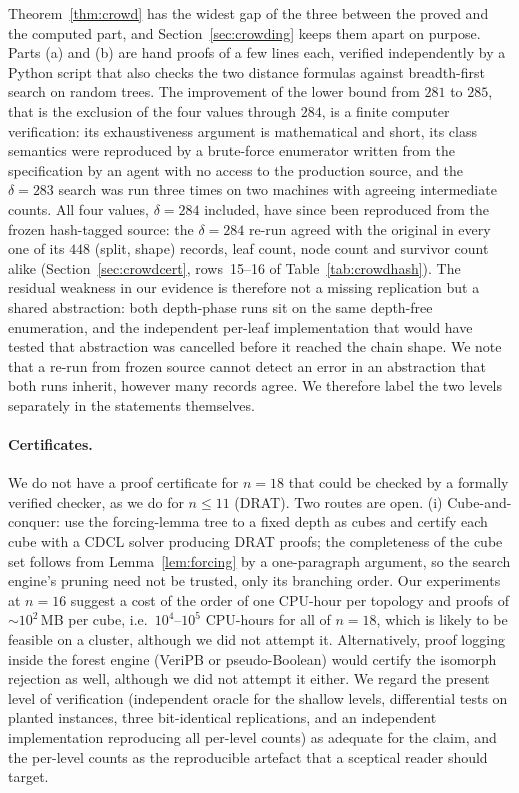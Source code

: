 \documentclass[11pt,a4paper]{article}
\theoremstyle{plain}
\theoremstyle{remark}
\begin{document}
Theorem~\ref{thm:crowd} has the widest gap of the three between the proved and
the computed part, and Section~\ref{sec:crowding} keeps them apart on purpose.
Parts (a) and (b) are hand proofs of a few lines each, verified independently by
a Python script that also checks the two distance formulas against
breadth-first search on random trees.  The improvement of the lower bound from $281$ to
$285$, that is the exclusion of the four values through $284$, is a finite
computer verification: its exhaustiveness argument is
mathematical and short, its class semantics were reproduced by a brute-force
enumerator written from the specification by an agent with no access to the
production source, and the $\delta=283$ search was run three times on two
machines with agreeing intermediate counts.  All four values, $\delta=284$
included, have since been reproduced from the frozen hash-tagged source: the
$\delta=284$ re-run agreed with the original in every one of its $448$
(split, shape) records, leaf count, node count and survivor count alike
(Section~\ref{sec:crowdcert}, rows~15--16 of Table~\ref{tab:crowdhash}).  The
residual weakness in our evidence is therefore not a missing replication but a
shared abstraction: both depth-phase runs sit on the same depth-free
enumeration, and the independent per-leaf implementation that would have tested
that abstraction was cancelled before it reached the chain shape.  We note that
a re-run from frozen source cannot detect an error in an abstraction that both
runs inherit, however many records agree.  We therefore label the two levels
separately in the statements themselves.

\paragraph{Certificates.}
We do not have a proof certificate for $n=18$ that could be checked by a
formally verified checker, as we do for $n\le 11$ (DRAT).  Two routes are open.
(i) Cube-and-conquer: use the forcing-lemma tree to a fixed depth as cubes and
certify each cube with a CDCL solver producing DRAT proofs; the completeness of
the cube set follows from Lemma~\ref{lem:forcing} by a one-paragraph argument,
so the search engine's pruning need not be trusted, only its branching order.
Our experiments at $n=16$ suggest a cost of the order of one CPU-hour per
topology and proofs of $\sim\!10^2$\,MB per cube, i.e.\ $10^4$--$10^5$ CPU-hours
for all of $n=18$, which is likely to be feasible on a cluster, although we did
not attempt it.  Alternatively, proof logging inside
the forest engine (VeriPB or pseudo-Boolean) would certify the isomorph
rejection as well, although we did not attempt it either.  We regard the present level of verification
(independent oracle for the shallow levels, differential tests on planted
instances, three bit-identical replications, and an independent implementation
reproducing all per-level counts) as adequate for the claim, and the per-level
counts as the reproducible artefact that a sceptical reader should target.
\end{document}
